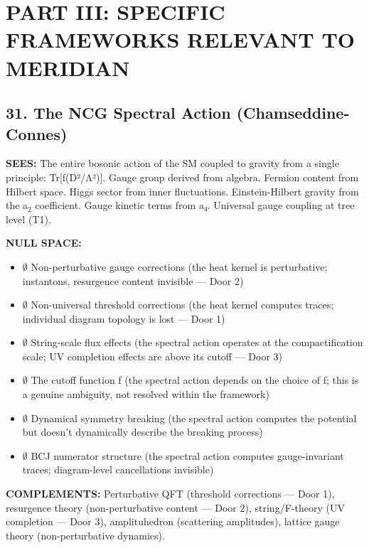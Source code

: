 \bigskip\noindent\makebox[\textwidth]{\color{rulegray}\rule{5cm}{0.3pt}}\bigskip


\section*{PART III: SPECIFIC FRAMEWORKS RELEVANT TO MERIDIAN}


\subsection*{31. The NCG Spectral Action (Chamseddine-Connes)}


\textbf{SEES:} The entire bosonic action of the SM coupled to gravity from a single principle: Tr[f(D²/\allowbreak Λ²)]. Gauge group derived from algebra. Fermion content from Hilbert space. Higgs sector from inner fluctuations. Einstein-Hilbert gravity from the a$_2$ coefficient. Gauge kinetic terms from a₄. Universal gauge coupling at tree level (T1).


\textbf{NULL SPACE:}

\begin{itemize}[nosep,leftmargin=*]
  \item $\emptyset$ Non-perturbative gauge corrections (the heat kernel is perturbative; instantons, resurgence content invisible — Door 2)
  \item $\emptyset$ Non-universal threshold corrections (the heat kernel computes traces; individual diagram topology is lost — Door 1)
  \item $\emptyset$ String-scale flux effects (the spectral action operates at the compactification scale; UV completion effects are above its cutoff — Door 3)
  \item $\emptyset$ The cutoff function f (the spectral action depends on the choice of f; this is a genuine ambiguity, not resolved within the framework)
  \item $\emptyset$ Dynamical symmetry breaking (the spectral action computes the potential but doesn't dynamically describe the breaking process)
  \item $\emptyset$ BCJ numerator structure (the spectral action computes gauge-invariant traces; diagram-level cancellations invisible)
\end{itemize}


\textbf{COMPLEMENTS:} Perturbative QFT (threshold corrections — Door 1), resurgence theory (non-perturbative content — Door 2), string/\allowbreak F-theory (UV completion — Door 3), amplituhedron (scattering amplitudes), lattice gauge theory (non-perturbative dynamics).


